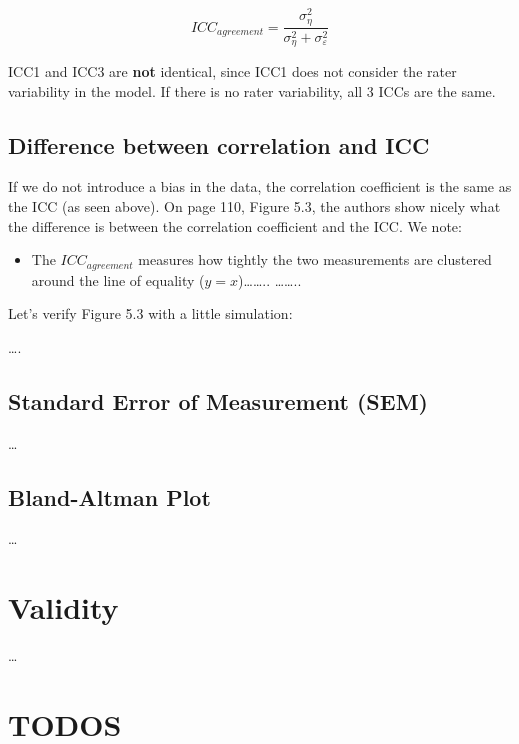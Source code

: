 \documentclass[
]{book}
\providecommand{\tightlist}{%
  \setlength{\itemsep}{0pt}\setlength{\parskip}{0pt}}
\begin{document}
\begin{itemize}
  \[ ICC_{agreement} = \frac{\sigma_{\eta}^2}{\sigma_{\eta}^2 + \sigma_{\varepsilon}^2}\]

  ICC1 and ICC3 are \textbf{not} identical, since ICC1 does not consider the rater variability
  in the model. If there is no rater variability, all 3 ICCs are the same.
\end{itemize}

\subsection{Difference between correlation and ICC}\label{difference-between-correlation-and-icc}

If we do not introduce a bias in the data, the correlation coefficient
is the same as the ICC (as seen above). On page 110, Figure 5.3, the authors show nicely
what the difference is between the correlation coefficient and the ICC. We note:

\begin{itemize}
\tightlist
\item
  The \(ICC_{agreement}\) measures how tightly the two measurements are
  clustered around the line of equality (\(y=x\))\ldots\ldots..
  \ldots\ldots..
\end{itemize}

Let's verify Figure 5.3 with a little simulation:

\ldots.

\subsection{Standard Error of Measurement (SEM)}\label{standard-error-of-measurement-sem}

\ldots{}

\subsection{Bland-Altman Plot}\label{bland-altman-plot}

\ldots{}

\section{Validity}\label{validity}

\ldots{}

\section{TODOS}\label{todos}
\end{document}
